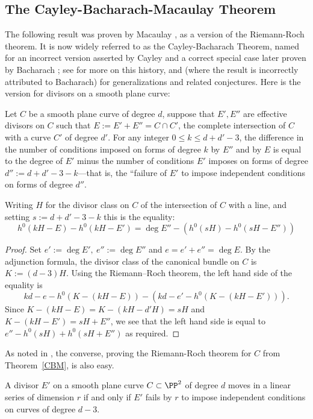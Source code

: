 \subsection{The Cayley-Bacharach-Macaulay Theorem}\label{CB section}

The following result was proven by Macaulay \cite[p.~424]{Macaulay1900}, as a version of the Riemann-Roch theorem. It is now widely referred to as the Cayley-Bacharach Theorem, named for an
incorrect version asserted by Cayley and a correct special case later proven by 
Bacharach\cite{Bacharach1886}
; see \cite[Section 2.3]{Threads} for more on this history, and 
\cite{MR1376653} (where the result is incorrectly attributed to Bacharach) for generalizations and related conjectures. Here is the version for divisors on a smooth plane curve:

\begin{theorem}\label{CBM} Let $C$ be a smooth plane curve of degree $d$, suppose that
$E', E''$ are effective divisors on $C$ such that $E:=E'+E'' = C\cap C'$, the complete intersection of $C$
with a curve $C'$ of degree $d'$. For any integer $0\leq k \leq d+d'-3$, the difference in the number of conditions imposed 
on forms of degree $k$ by $E''$ and by $E$ is equal to the degree of $E'$ minus the
number of conditions $E'$ imposes on forms of degree $d'':=d+d'-3 -k$---that is, the ``failure of
$E'$ to impose independent conditions on forms of degree $d''$.

 Writing $H$ for
the divisor class on $C$ of the intersection of $C$ with a line, and setting $s := d+d'-3-k$ this is the equality:
$$
h^0(kH-E) - h^0(kH-E')  = \deg E'' - \left(h^0(sH) -  h^0(sH-E'')\right)
$$
\end{theorem}

\begin{proof}
Set $e' := \deg E', \ e'':= \deg E''$ and $e = e'+e'' = \deg E.$
By the adjunction formula, the divisor class of the canonical bundle on $C$ is $K := (d-3)H$. Using the Riemann--Roch theorem, the left hand side of the equality is
$$
kd-e-h^0(K - (kH-E)) - \left(kd-e' - h^0(K-(kH-E'))\right).
$$
Since $K - (kH-E) = K - (kH-d'H) = sH$ and  $K-(kH-E') = sH+E''$, we see that the 
left hand side is equal to 
$
e'' - h^0(sH) +  h^0(sH+E'')
$
as required.
\end{proof}

As noted in \cite{Threads}, the converse, proving the Riemann-Roch theorem for $C$ from Theorem~\ref{CBM}, is also easy.

\begin{corollary}\label{CBM cor 1}
A divisor $E'$ on a smooth plane curve $C\subset \PP^2$ of degree $d$ moves
in a linear series of dimension $r$ if and only if $E'$ fails by $r$ to impose
independent conditions on curves of degree $d-3$.
\end{corollary}

